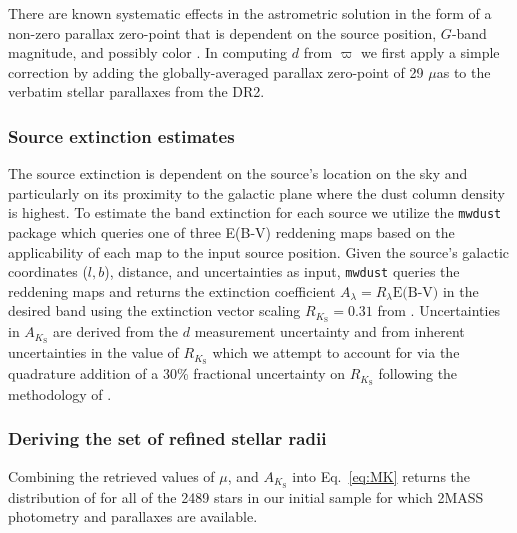 There are known systematic effects in the \gaia{} astrometric solution in the form of a non-zero parallax zero-point
that is dependent on the source position, $G$-band magnitude, and possibly color \citep{lindegren18}.
In computing $d$ from $\varpi$ we first apply a simple correction by adding the globally-averaged parallax
zero-point of 29 $\mu$as \citep{lindegren18} to the verbatim stellar parallaxes from the \gaia{} DR2.

\subsubsection{Source extinction estimates} \label{sect:AK}
The source extinction is dependent on the source's location on the sky and particularly on
its proximity to the galactic plane where the dust column density is highest. To estimate the \Ks{-}band extinction
for each source we utilize the \texttt{mwdust} package \citep{bovy16} which queries one of three E(B-V) reddening maps
\citep[i.e.][]{drimmel03,marshall06,green15} based on the applicability of each map to the input source position.
Given the source's galactic coordinates ($l,b$), \gaia{} distance, and uncertainties as input, \texttt{mwdust}
queries the reddening maps and returns the extinction coefficient $A_{\lambda}=R_{\lambda} \text{E(B-V)}$ in the desired
band using the extinction vector scaling $R_{K_{\text{S}}}=0.31$ from \cite{schlafly11}. Uncertainties in $A_{K_{\text{S}}}$ are
derived from the $d$ measurement uncertainty and from inherent uncertainties in the value of $R_{K_{\text{S}}}$
\citep[e.g.]{green18}
which we attempt to account for via the quadrature addition of a 30\% fractional uncertainty on $R_{K_{\text{S}}}$ following
the methodology of \citep{fulton18}. 

\subsubsection{Deriving the set of refined stellar radii}
Combining the retrieved values of \Ks{,} $\mu$, and $A_{K_{\text{S}}}$ into Eq.~\ref{eq:MK} returns the
distribution of \MK{} for all of the 2489 stars in our initial sample for which 2MASS photometry and \gaia{}
parallaxes are available. \\

